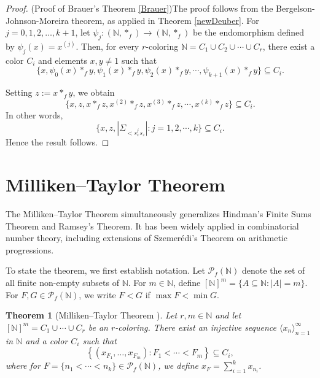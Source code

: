 \documentclass[12pt]{amsart}
\theoremstyle{plain}
\newtheorem{theorem}{Theorem}[section]
\theoremstyle{definition}
\theoremstyle{remark}
\numberwithin{equation}{section}
\begin{document}
\begin{proof}(Proof of Brauer's Theorem \ref{Brauer})The proof follows from the Bergelson-Johnson-Moreira theorem, as applied in Theorem \ref{newDeuber}. For $j=0,1,2, \dots, k+1$, let $\psi_j : (\mathbb{N}, \ast_f) \to (\mathbb{N}, \ast_f)$ be the endomorphism defined by $\psi_j(x) = x^{(j)}$. Then, for every $r$-coloring $\mathbb{N}= C_1 \cup C_2  \cup \cdots \cup C_r$, there exist a color $C_i$ and elements $x, y \neq 1$ such that
\begin{equation}\label{deuequ}
\{x, \psi_0(x) \ast_f y, \psi_1(x) \ast_f y, \psi_2(x) \ast_f y , \cdots, \psi_{k+1}(x) \ast_f y\} \subseteq C_i .
\end{equation}
%


Setting $z:= x \ast_f y$, we obtain 
\[
\{x, z, x\ast_f z, x^{(2)} \ast_f z, x^{(3)} \ast_f z , \cdots, x^{(k)} \ast_f z \} \subseteq C_i.
\]
In other words,
\[
\{x, z, \left|\Sigma_{<s_x^js_z}\right|: j=1,2, \cdots, k\} \subseteq C_i.
\]
Hence the result follows.
\end{proof}




\section{Milliken--Taylor Theorem}

The Milliken--Taylor Theorem simultaneously generalizes Hindman's Finite Sums Theorem and Ramsey's Theorem. It has been widely applied in combinatorial number theory, including extensions of Szemerédi's Theorem on arithmetic progressions.

To state the theorem, we first establish notation. Let $\mathcal{P}_f(\mathbb{N})$ denote the set of all finite non-empty subsets of $\mathbb{N}$. For $m \in \mathbb{N}$, define $[\mathbb{N}]^m = \{A \subseteq \mathbb{N} : |A| = m\}$. For $F, G \in \mathcal{P}_f(\mathbb{N})$, we write $F < G$ if $\max F < \min G$.

\begin{theorem}[Milliken--Taylor Theorem \cite{Milli75, Tay76}]\label{thm:Milliken--Taylor}
  Let $r, m \in \mathbb{N}$ and let $[\mathbb{N}]^m = C_1 \cup \cdots \cup C_r$ be an $r$-coloring. There exist an injective sequence $\langle x_n \rangle_{n=1}^\infty$ in $\mathbb{N}$ and a color $C_i$ such that  
  \[
    \left\{(x_{F_1}, \dots, x_{F_m}) : F_1 < \cdots < F_m\right\} \subseteq C_i,
  \]
  where for $F = \{n_1 < \cdots < n_k\} \in \mathcal{P}_f(\mathbb{N})$, we define $x_F = \sum_{i=1}^k x_{n_i}$.
\end{theorem}
\end{document}
